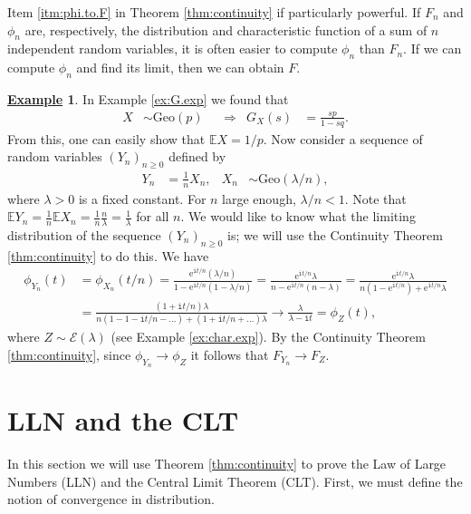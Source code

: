 \documentclass[12pt]{book}
\numberwithin{equation}{chapter}
\theoremstyle{plain}
\numberwithin{theorem}{section}
\theoremstyle{definition}
\newtheorem{example}[theorem]{\underline{Example}}
\numberwithin{exercise}{chapter}
\newcommand{\<}{\langle}
\renewcommand{\>}{\rangle}
\renewcommand{\(}{\left(}
\renewcommand{\)}{\right)}
\renewcommand{\[}{\left[}
\renewcommand{\]}{\right]}
\newcommand\Eb{\mathds{E}}
\newcommand\Ec{\mathscr{E}}
\newcommand\lam{\lambda}
\newcommand\ii{\mathtt{i}}
\newcommand\ee{\mathrm{e}}
\begin{document}
\noindent
Item \ref{itm:phi.to.F} in Theorem \ref{thm:continuity} if particularly powerful.  If $F_n$ and $\phi_n$ are, respectively, the distribution and characteristic function of a sum of $n$ independent random variables, it is often easier to compute $\phi_n$ than $F_n$.  If we can compute $\phi_n$ and find its limit, then we can obtain $F$.

\begin{example}
In Example \ref{ex:G.exp} we found that 
\begin{align}
X 
	&\sim \text{Geo}(p)&
	&\Rightarrow&
G_X(s)
	&= \frac{sp}{1-sq} . 
\end{align}
From this, one can easily show that $\Eb X = 1/p$.  Now consider a sequence of random variables $(Y_n)_{n \geq 0}$ defined by
\begin{align}
Y_n
	&= 	\frac{1}{n} X_n , &
X_n
	&\sim \text{Geo}(\lam/n) ,
\end{align}
where $\lam>0$ is a fixed constant.  For $n$ large enough, $\lam/n < 1$.  
Note that $\Eb Y_n = \frac{1}{n} \Eb X_n = \frac{1}{n} \frac{n}{\lam}= \frac{1}{\lam}$ for all $n$.
We would like to know what the limiting distribution of the sequence $(Y_n)_{n \geq 0}$ is; we will use the Continuity Theorem \ref{thm:continuity} to do this.
We have
\begin{align}
\phi_{Y_n}(t)
	&=	\phi_{X_n}(t/n)
	=		\frac{ \ee^{\ii t/n}(\lam/n)}{1-\ee^{\ii t/n}(1-\lam/n)}
	=		\frac{ \ee^{\ii t/n}\lam }{n -\ee^{\ii t/n}(n-\lam)}
	=		\frac{ \ee^{\ii t/n}\lam }{n(1 -\ee^{\ii t/n}) + \ee^{\ii t/n} \lam} \\
	&=		\frac{ (1 + \ii t/n)\lam }{n(1 - 1 - \ii t/n - \ldots ) + (1 + \ii t/n + \ldots ) \lam}
	\to	\frac{\lam}{\lam - \ii t} = \phi_Z(t) ,
\end{align}
where $Z \sim \Ec(\lam)$ (see Example \ref{ex:char.exp}).  By the Continuity Theorem \ref{thm:continuity}, since $\phi_{Y_n} \to \phi_Z$ it follows that $F_{Y_n} \to F_Z$.
\end{example}


\section{LLN and the CLT}
\label{sec:slln.clt}
In this section we will use Theorem \ref{thm:continuity} to prove the Law of Large Numbers (LLN) and the Central Limit Theorem (CLT).  First, we must define the notion of convergence in distribution.
\end{document}
